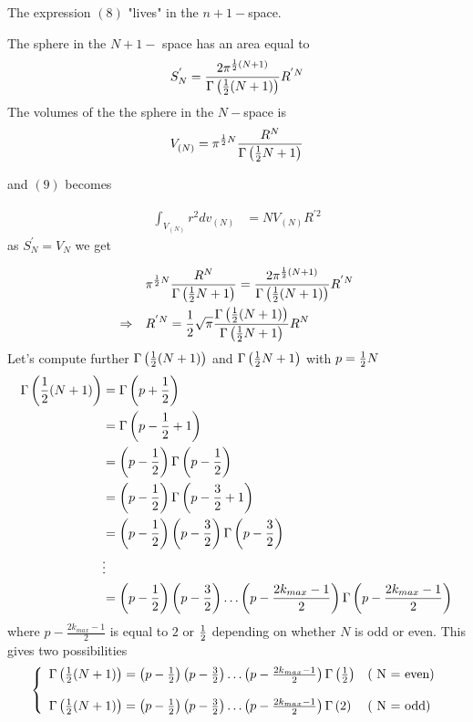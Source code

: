 The expression $(8)$ "lives" in the $n+1-$space.

The sphere in the $N+1-$ space has an area equal to
$$S^{'}_{N}= \frac{2\pi^{\frac{1}{2}(N+1)}}{\Gamma\left(\frac{1}{2} (N+1)\right)}R^{'N}$$
The volumes of the the sphere in the $N-$space is
\begin{align}
V^{}_{(N)} = \pi^{\frac{1}{2} N} \frac{R^{N}}{\Gamma \left(\frac{1}{2} N+1\right)}
\end{align}

and $(9)$ becomes

\begin{align}
\int_{V_{(N)}} r^2 dv_{(N)}&=N V^{}_{(N)} R^{'2 }
\end{align}
as $S^{'}_N=V^{}_N$ we get

\begin{align}
& \pi^{\frac{1}{2} N} \frac{R^{N}}{\Gamma \left(\frac{1}{2} N+1\right)}=\frac{2\pi^{\frac{1}{2}(N+1)}}{\Gamma\left(\frac{1}{2} (N+1)\right)}R^{'N}\\
\Rightarrow \quad & R^{'N} =\frac{1}{2}\sqrt{\pi}\frac{\Gamma\left(\frac{1}{2} (N+1)\right)}{\Gamma \left(\frac{1}{2} N+1\right)}R^{N}
\end{align}
Let's compute further $\Gamma\left(\frac{1}{2} (N+1)\right)$ and $\Gamma \left(\frac{1}{2} N+1\right)$ with $p=\frac{1}{2} N$
\begin{align}
\Gamma\left(\frac{1}{2} (N+1)\right) &= \Gamma\left(p+ \frac{1}{2} \right)\\
&= \Gamma\left(p-\frac{1}{2}+1 \right)\\
&= \left(p-\frac{1}{2}\right)\Gamma\left(p-\frac{1}{2} \right)\\
&= \left(p-\frac{1}{2}\right)\Gamma\left(p-\frac{3}{2} +1\right)\\
&= \left(p-\frac{1}{2}\right)\left(p-\frac{3}{2}\right)\Gamma\left(p-\frac{3}{2} \right)\\
&\vdots\\ 
&= \left(p-\frac{1}{2}\right)\left(p-\frac{3}{2}\right)\dots \left(p-\frac{2 k_{max}-1}{2}\right)\Gamma\left(p-\frac{2 k_{max}-1}{2} \right)
\end{align}
where $ p-\frac{2 k_{max}-1}{2}$ is equal to $2$ or $\frac{1}{2}$ depending on whether $N$ is odd or even.
This gives two possibilities
\begin{align}
\left\{\begin{array}{ll}
\Gamma\left(\frac{1}{2} (N+1)\right) = \left(p-\frac{1}{2}\right)\left(p-\frac{3}{2}\right)\dots \left(p-\frac{2 k_{max}-1}{2}\right)\Gamma\left(\frac{1}{2}  \right)& \text{( N = even)}\\\\
\Gamma\left(\frac{1}{2} (N+1)\right) = \left(p-\frac{1}{2}\right)\left(p-\frac{3}{2}\right)\dots \left(p-\frac{2 k_{max}-1}{2}\right)\Gamma\left(2 \right)& \text{( N = odd)}\\
\end{array}\right.
\end{align}
